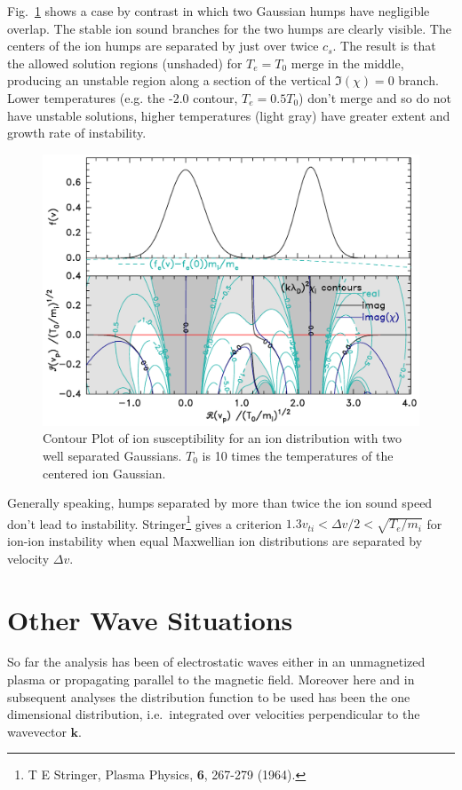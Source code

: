\documentclass[12pt]{article}
\begin{document}
Fig.\ \ref{separatehumps} shows a case by contrast in which two
Gaussian humps have negligible overlap.
The stable ion sound branches for the two humps are clearly visible.
The centers of the ion humps are separated by just over twice
$c_s$. The result is that the allowed solution regions (unshaded) for
$T_e=T_0$ merge in the middle, producing an unstable region along a
section of the vertical $\Im(\chi)=0$ branch. Lower temperatures
(e.g. the -2.0 contour, $T_e=0.5T_0$) don't merge and so do not have
unstable solutions, higher temperatures (light gray) have greater
extent and growth rate of instability.
\begin{figure}[htp]
  \center\includegraphics[width=0.7\hsize]{twonarrowgauss}\endcenter
  \caption{Contour Plot of ion susceptibility for an ion distribution
    with two well separated Gaussians. $T_0$ is 10 times the
    temperatures of the centered ion Gaussian. \label{separatehumps}}
\end{figure}
Generally speaking, humps separated by more than twice the ion sound speed
don't lead to instability. Stringer\footnote{T E Stringer, Plasma
  Physics, {\bf 6}, 267-279 (1964).} gives a criterion $1.3 v_{ti}<
\Delta v/2 < \sqrt{T_e/m_i}$ for ion-ion instability when equal
Maxwellian ion distributions are separated by velocity $\Delta v$.

\section{Other Wave Situations}

So far the analysis has been of electrostatic waves either in an
unmagnetized plasma or propagating parallel to the magnetic field.
Moreover here and in subsequent analyses the distribution function to
be used has been the one dimensional distribution, i.e.\ integrated
over velocities perpendicular to the wavevector $\bm k$.  
\end{document}
